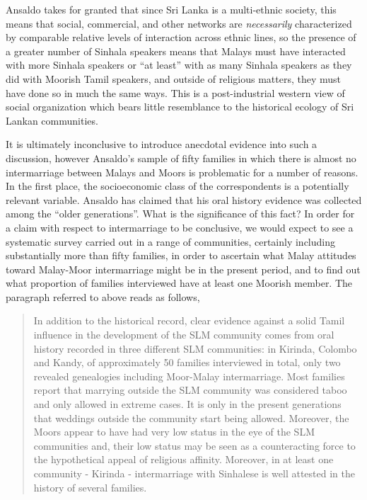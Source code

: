Ansaldo takes for granted that since Sri Lanka is a multi-ethnic society, this means that social, commercial, and other networks are \textit{necessarily} characterized by comparable relative levels of interaction across ethnic lines, so the presence of a greater number of Sinhala speakers means that Malays must have interacted with more Sinhala speakers or ``at least'' with as many Sinhala speakers as they did with Moorish Tamil speakers, and outside of religious matters, they must have done so in much the same ways. This is a post-industrial western view of social organization which bears little resemblance to the historical ecology of Sri Lankan communities.

It is ultimately inconclusive to introduce anecdotal evidence into such a discussion, however Ansaldo's sample of fifty families in which there is almost no intermarriage between Malays and Moors is problematic for a number of reasons.  In the first place, the socioeconomic class of the correspondents is a potentially relevant variable. Ansaldo has claimed that his oral history evidence was collected among the ``older generations''. What is the significance of this fact?  In order for a claim with respect to intermarriage to be conclusive, we would expect to see a systematic survey carried out in a range of communities, certainly including substantially more than fifty families, in order to ascertain what Malay attitudes toward Malay-Moor intermarriage might be in the present period, and to find out what proportion of families interviewed have at least one Moorish member.  The paragraph referred to above reads as follows,

\begin{quote}
 In addition to the historical record, clear evidence against a solid Tamil influence in the development of the SLM community comes from oral history recorded in three different SLM communities: in Kirinda, Colombo and Kandy, of approximately 50 families interviewed in total, only two revealed genealogies including Moor-Malay intermarriage.  Most families report that marrying outside the SLM community was considered taboo and only allowed in extreme cases.  It is only in the present generations that weddings outside the community start being allowed.  Moreover, the Moors appear to have had very low status in the eye of the SLM communities and, their low status may be seen as a counteracting force to the hypothetical appeal of religious affinity.  Moreover, in at least one community - Kirinda - intermarriage with Sinhalese is well attested in the history of several families. 
\end{quote}

